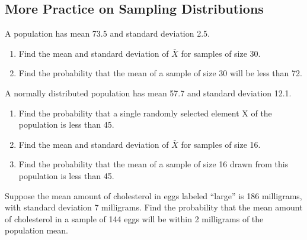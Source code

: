 \vspace*{6\baselineskip}

\hypertarget{more-practice-on-sampling-distributions}{%
\subsection{More Practice on Sampling
Distributions}\label{more-practice-on-sampling-distributions}}

\begin{exercise}

A population has mean 73.5 and standard deviation 2.5.

\begin{enumerate}
\item
  Find the mean and standard deviation of \(\bar{X}\) for samples of
  size 30.
\item
  Find the probability that the mean of a sample of size 30 will be less
  than 72.
\end{enumerate}

\end{exercise}

\begin{exercise}

A normally distributed population has mean 57.7 and standard deviation
12.1.

\begin{enumerate}
\item
  Find the probability that a single randomly selected element X of the
  population is less than 45.
\item
  Find the mean and standard deviation of \(\bar{X}\) for samples of
  size 16.
\item
  Find the probability that the mean of a sample of size 16 drawn from
  this population is less than 45.
\end{enumerate}

\end{exercise}

\begin{exercise}

Suppose the mean amount of cholesterol in eggs labeled ``large'' is 186
milligrams, with standard deviation 7 milligrams. Find the probability
that the mean amount of cholesterol in a sample of 144 eggs will be
within 2 milligrams of the population mean.

\end{exercise}

\vspace*{6\baselineskip}

